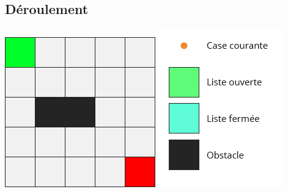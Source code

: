 \documentclass[11pt]{beamer}
\begin{document}
	\subsection{Déroulement}
		\begin{frame}
			\begin{center}
				\includegraphics[scale=0.5]{images/Algo_1.png}
				\hspace{1cm}
				\includegraphics[scale=0.5]{images/Legend.png}
			\end{center}
		\end{frame}
\end{document}
